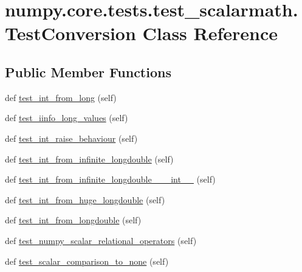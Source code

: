 \hypertarget{classnumpy_1_1core_1_1tests_1_1test__scalarmath_1_1TestConversion}{}\section{numpy.\+core.\+tests.\+test\+\_\+scalarmath.\+Test\+Conversion Class Reference}
\label{classnumpy_1_1core_1_1tests_1_1test__scalarmath_1_1TestConversion}
\subsection*{Public Member Functions}
\begin{DoxyCompactItemize}
\item 
def \hyperlink{classnumpy_1_1core_1_1tests_1_1test__scalarmath_1_1TestConversion_ab691eeeae6588cd3106ad58d68f4f5c9}{test\+\_\+int\+\_\+from\+\_\+long} (self)
\item 
def \hyperlink{classnumpy_1_1core_1_1tests_1_1test__scalarmath_1_1TestConversion_a18f4a2d21ca0da4b8ad06e767ea375a3}{test\+\_\+iinfo\+\_\+long\+\_\+values} (self)
\item 
def \hyperlink{classnumpy_1_1core_1_1tests_1_1test__scalarmath_1_1TestConversion_a4a47984af10e34ad992251acd40f64ee}{test\+\_\+int\+\_\+raise\+\_\+behaviour} (self)
\item 
def \hyperlink{classnumpy_1_1core_1_1tests_1_1test__scalarmath_1_1TestConversion_acb2eba9e77ee73c1176255dfb94f3155}{test\+\_\+int\+\_\+from\+\_\+infinite\+\_\+longdouble} (self)
\item 
def \hyperlink{classnumpy_1_1core_1_1tests_1_1test__scalarmath_1_1TestConversion_ac68c4fad3fc4b85e3320e208730d9d66}{test\+\_\+int\+\_\+from\+\_\+infinite\+\_\+longdouble\+\_\+\+\_\+\+\_\+int\+\_\+\+\_\+} (self)
\item 
def \hyperlink{classnumpy_1_1core_1_1tests_1_1test__scalarmath_1_1TestConversion_a52cb5c14e146b4e0cf5725b68d7b87eb}{test\+\_\+int\+\_\+from\+\_\+huge\+\_\+longdouble} (self)
\item 
def \hyperlink{classnumpy_1_1core_1_1tests_1_1test__scalarmath_1_1TestConversion_a414eb66268d2fbab9c802504912e825a}{test\+\_\+int\+\_\+from\+\_\+longdouble} (self)
\item 
def \hyperlink{classnumpy_1_1core_1_1tests_1_1test__scalarmath_1_1TestConversion_acbfab4e5e383096e6bab78484d488ae9}{test\+\_\+numpy\+\_\+scalar\+\_\+relational\+\_\+operators} (self)
\item 
def \hyperlink{classnumpy_1_1core_1_1tests_1_1test__scalarmath_1_1TestConversion_acc2e3a64b670ecee0cc696caa4dc9b7d}{test\+\_\+scalar\+\_\+comparison\+\_\+to\+\_\+none} (self)
\end{DoxyCompactItemize}
